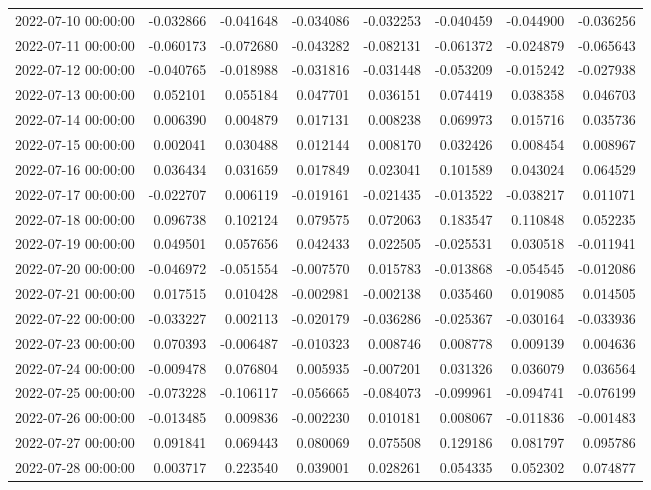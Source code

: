 \begin{tabular}{lrrrrrrr}
2022-07-10 00:00:00 & -0.032866 & -0.041648 & -0.034086 & -0.032253 & -0.040459 & -0.044900 & -0.036256 \\
2022-07-11 00:00:00 & -0.060173 & -0.072680 & -0.043282 & -0.082131 & -0.061372 & -0.024879 & -0.065643 \\
2022-07-12 00:00:00 & -0.040765 & -0.018988 & -0.031816 & -0.031448 & -0.053209 & -0.015242 & -0.027938 \\
2022-07-13 00:00:00 & 0.052101 & 0.055184 & 0.047701 & 0.036151 & 0.074419 & 0.038358 & 0.046703 \\
2022-07-14 00:00:00 & 0.006390 & 0.004879 & 0.017131 & 0.008238 & 0.069973 & 0.015716 & 0.035736 \\
2022-07-15 00:00:00 & 0.002041 & 0.030488 & 0.012144 & 0.008170 & 0.032426 & 0.008454 & 0.008967 \\
2022-07-16 00:00:00 & 0.036434 & 0.031659 & 0.017849 & 0.023041 & 0.101589 & 0.043024 & 0.064529 \\
2022-07-17 00:00:00 & -0.022707 & 0.006119 & -0.019161 & -0.021435 & -0.013522 & -0.038217 & 0.011071 \\
2022-07-18 00:00:00 & 0.096738 & 0.102124 & 0.079575 & 0.072063 & 0.183547 & 0.110848 & 0.052235 \\
2022-07-19 00:00:00 & 0.049501 & 0.057656 & 0.042433 & 0.022505 & -0.025531 & 0.030518 & -0.011941 \\
2022-07-20 00:00:00 & -0.046972 & -0.051554 & -0.007570 & 0.015783 & -0.013868 & -0.054545 & -0.012086 \\
2022-07-21 00:00:00 & 0.017515 & 0.010428 & -0.002981 & -0.002138 & 0.035460 & 0.019085 & 0.014505 \\
2022-07-22 00:00:00 & -0.033227 & 0.002113 & -0.020179 & -0.036286 & -0.025367 & -0.030164 & -0.033936 \\
2022-07-23 00:00:00 & 0.070393 & -0.006487 & -0.010323 & 0.008746 & 0.008778 & 0.009139 & 0.004636 \\
2022-07-24 00:00:00 & -0.009478 & 0.076804 & 0.005935 & -0.007201 & 0.031326 & 0.036079 & 0.036564 \\
2022-07-25 00:00:00 & -0.073228 & -0.106117 & -0.056665 & -0.084073 & -0.099961 & -0.094741 & -0.076199 \\
2022-07-26 00:00:00 & -0.013485 & 0.009836 & -0.002230 & 0.010181 & 0.008067 & -0.011836 & -0.001483 \\
2022-07-27 00:00:00 & 0.091841 & 0.069443 & 0.080069 & 0.075508 & 0.129186 & 0.081797 & 0.095786 \\
2022-07-28 00:00:00 & 0.003717 & 0.223540 & 0.039001 & 0.028261 & 0.054335 & 0.052302 & 0.074877 \\

\end{tabular}
